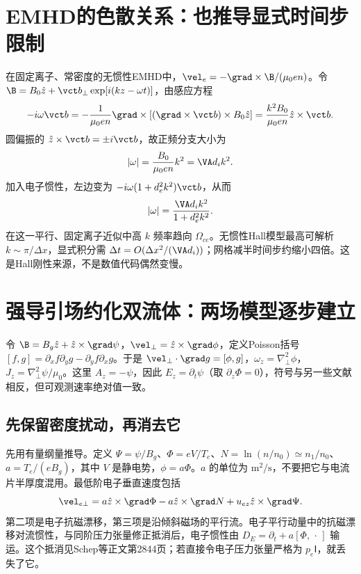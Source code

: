 \section{EMHD的色散关系：也推导显式时间步限制}
在固定离子、常密度的无惯性EMHD中，$\vel_e=-\grad\times\B/(\mu_0en)$。令 $\B=B_0\hat z+\vct b_\perp\exp[i(kz-\omega t)]$，由感应方程
\begin{equation}-i\omega\vct b=-{1\over\mu_0en}\grad\times[(\grad\times\vct b)\times B_0\hat z]
={k^2B_0\over\mu_0en}\hat z\times\vct b.
\end{equation}
圆偏振的 $\hat z\times\vct b=\pm i\vct b$，故正频分支大小为
\begin{equation}|\omega|={B_0\over\mu_0en}k^2=\VA d_i k^2.\label{eq:whistler}\end{equation}
加入电子惯性，左边变为 $-i\omega(1+d_e^2k^2)\vct b$，从而
\begin{equation}|\omega|={\VA d_i k^2\over1+d_e^2k^2}.
\end{equation}
在这一平行、固定离子近似中高 $k$ 频率趋向 $\Omega_{ce}$。无惯性Hall模型最高可解析 $k\sim\pi/\Delta x$，显式积分需 $\Delta t=O(\Delta x^2/(\VA d_i))$；网格减半时间步约缩小四倍。这是Hall刚性来源，不是数值代码偶然变慢。

\section{强导引场约化双流体：两场模型逐步建立}
令 $\B=B_g\hat z+\hat z\times\grad\psi$，$\vel_\perp=\hat z\times\grad\phi$，定义Poisson括号
$[f,g]=\partial_xf\partial_yg-\partial_yf\partial_xg$。于是 $\vel_\perp\cdot\grad g=[\phi,g]$，$\omega_z=\nabla_\perp^2\phi$，$J_z=\nabla_\perp^2\psi/\mu_0$。这里 $A_z=-\psi$，因此 $E_z=\partial_t\psi$（取 $\partial_z\Phi=0$），符号与另一些文献相反，但可观测速率绝对值一致。

\subsection{先保留密度扰动，再消去它}
先用有量纲量推导。定义 $\Psi=\psi/B_g$、$\Phi=eV/T_e$、$N=\ln(n/n_0)\simeq n_1/n_0$、$a=T_e/(eB_g)$，其中 $V$ 是静电势，$\phi=a\Phi$。$a$ 的单位为 $\mathrm{m^2/s}$，不要把它与电流片半厚度混用。最低阶电子垂直速度包括
\begin{equation}
\vel_{e\perp}=a\hat z\times\grad\Phi-a\hat z\times\grad N+u_{ez}\hat z\times\grad\Psi.
\end{equation}
第二项是电子抗磁漂移，第三项是沿倾斜磁场的平行流。电子平行动量中的抗磁漂移对流惯性，与同阶压力张量修正抵消后，电子惯性由 $D_E=\partial_t+a[\Phi,\,\cdot\,]$ 输运。这个抵消见Schep等正文第2844页；若直接令电子压力张量严格为 $p_e\mathsf I$，就丢失了它。

